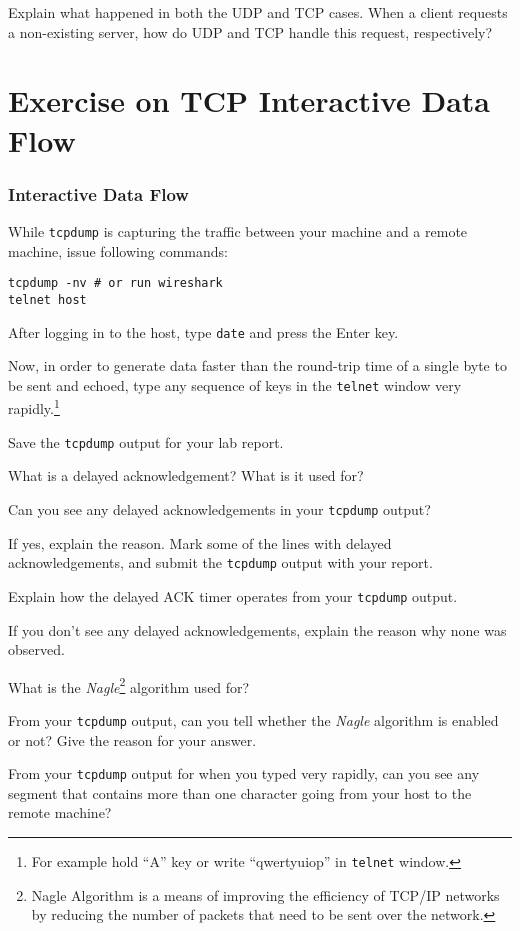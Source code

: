 \documentclass{../UTNetLab}
\begin{document}
    \begin{report}
        \item Explain what happened in both the UDP and TCP cases.
                When a client requests a non-existing server, how do UDP and TCP handle this request, respectively?
    \end{report}

\part{Exercise on TCP Interactive Data Flow}
\section{Interactive Data Flow}
While \lstinline{tcpdump} is capturing the traffic between your machine and a remote machine, issue following commands:
    \begin{lstlisting}[emph={host}]
tcpdump -nv # or run wireshark
telnet host
    \end{lstlisting}
    After logging in to the host, type \lstinline{date} and press the {Enter} key.

    Now, in order to generate data faster than the round-trip time of a single byte to be sent and echoed, type any sequence of keys in the \lstinline{telnet} window very rapidly.\footnote{For example hold ``A'' key or write ``qwertyuiop'' in \lstinline{telnet} window.}

    {Save} the \lstinline{tcpdump} output for your lab report.
    
    \begin{report}
        \item What is a delayed acknowledgement?
            What is it used for?
        
        \item Can you see any delayed acknowledgements in your \lstinline{tcpdump} output?

            If yes, explain the reason.
            Mark some of the lines with delayed acknowledgements, and submit the \lstinline{tcpdump} output with your report.

            Explain how the delayed ACK timer operates from your \lstinline{tcpdump} output.

            If you don’t see any delayed acknowledgements, explain the reason why none was observed.
        
        \item What is the \textit{Nagle}\footnote{Nagle Algorithm is a means of improving the efficiency of TCP/IP networks by reducing the number of packets that need to be sent over the network.} algorithm used for?

            From your \lstinline{tcpdump} output, can you tell whether the \textit{Nagle} algorithm is enabled or not? Give the reason for your answer.

            From your \lstinline{tcpdump} output for when you typed very rapidly, can you see any segment that contains more than one character going from your host to the remote machine?
    \end{report}
\end{document}
